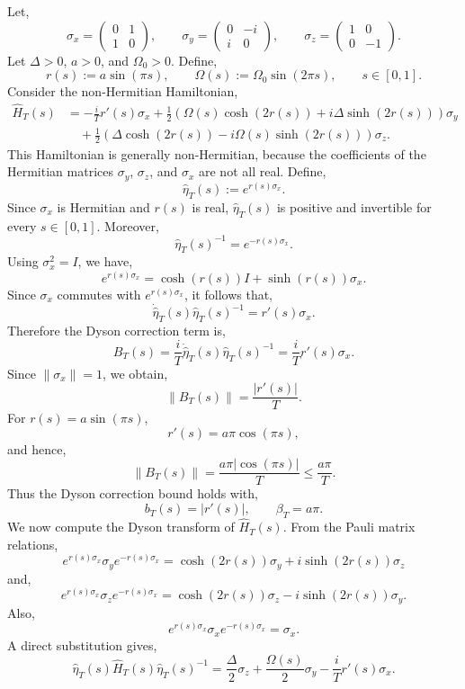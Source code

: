 \documentclass[pdflatex,sn-mathphys-num]{sn-jnl}
\theoremstyle{thmstyleone}
\theoremstyle{thmstyletwo}
\theoremstyle{thmstylethree}
\begin{document}
Let,
\[
\sigma_x=
\begin{pmatrix}
0&1\\
1&0
\end{pmatrix},
\qquad
\sigma_y=
\begin{pmatrix}
0&-i\\
i&0
\end{pmatrix},
\qquad
\sigma_z=
\begin{pmatrix}
1&0\\
0&-1
\end{pmatrix}.
\]
Let \(\Delta>0\), \(a>0\), and \(\Omega_0>0\). Define,
\[
r(s):=a\sin(\pi s),
\qquad
\Omega(s):=\Omega_0\sin(2\pi s),
\qquad s\in[0,1].
\]
Consider the non-Hermitian Hamiltonian,
\[
\begin{aligned}
\hat H_T(s)
&=
-\frac{i}{T}r'(s)\sigma_x +
\frac{1}{2}
\left(
\Omega(s)\cosh(2r(s))
+
i\Delta\sinh(2r(s))
\right)\sigma_y  \\
&\quad+
\frac{1}{2}
\left(
\Delta\cosh(2r(s))
-
i\Omega(s)\sinh(2r(s))
\right)\sigma_z .
\end{aligned}
\]
This Hamiltonian is generally non-Hermitian, because the coefficients of the
Hermitian matrices \(\sigma_y\), \(\sigma_z\), and \(\sigma_x\) are not all real.
Define,
\[
\hat\eta_T(s):=e^{r(s)\sigma_x}.
\]
Since \(\sigma_x\) is Hermitian and \(r(s)\) is real, \(\hat\eta_T(s)\) is
positive and invertible for every \(s\in[0,1]\). Moreover,
\[
\hat\eta_T(s)^{-1}=e^{-r(s)\sigma_x}.
\]
Using \(\sigma_x^2=I\), we have,
\[
e^{r(s)\sigma_x}
=
\cosh(r(s))I+\sinh(r(s))\sigma_x.
\]
Since \(\sigma_x\) commutes with \(e^{r(s)\sigma_x}\), it follows that,
\[
\dot{\hat\eta}_T(s)\hat\eta_T(s)^{-1}
=
r'(s)\sigma_x.
\]
Therefore the Dyson correction term is,
\[
B_T(s)
=
\frac{i}{T}\dot{\hat\eta}_T(s)\hat\eta_T(s)^{-1}
=
\frac{i}{T}r'(s)\sigma_x.
\]
Since \(\|\sigma_x\|=1\), we obtain,
\[
\|B_T(s)\|
=
\frac{|r'(s)|}{T}.
\]
For \(r(s)=a\sin(\pi s)\),
\[
r'(s)=a\pi\cos(\pi s),
\]
and hence,
\[
\|B_T(s)\|
=
\frac{a\pi|\cos(\pi s)|}{T}
\le
\frac{a\pi}{T}.
\]
Thus the Dyson correction bound holds with,
\[
b_T(s)=|r'(s)|,
\qquad
\beta_{T}=a\pi.
\]
We now compute the Dyson transform of \(\hat H_T(s)\). From the Pauli matrix
relations,
\[
e^{r(s)\sigma_x}\sigma_y e^{-r(s)\sigma_x}
=
\cosh(2r(s))\sigma_y
+
i\sinh(2r(s))\sigma_z
\]
and,
\[
e^{r(s)\sigma_x}\sigma_z e^{-r(s)\sigma_x}
=
\cosh(2r(s))\sigma_z
-
i\sinh(2r(s))\sigma_y.
\]
Also,
\[
e^{r(s)\sigma_x}\sigma_x e^{-r(s)\sigma_x}
=
\sigma_x.
\]
A direct substitution gives,
\[
\hat\eta_T(s)\hat H_T(s)\hat\eta_T(s)^{-1}
=
\frac{\Delta}{2}\sigma_z
+
\frac{\Omega(s)}{2}\sigma_y
-
\frac{i}{T}r'(s)\sigma_x.
\]
\end{document}
